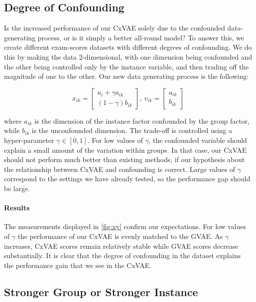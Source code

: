 \documentclass[nohyperref]{article}
\theoremstyle{plain}
\theoremstyle{definition}
\theoremstyle{remark}
\begin{document}
\subsection{Degree of Confounding}

Is the increased performance of our CxVAE solely due to the confounded data-generating process, or is it simply a better all-round model? To answer this, we create different exam-scores datasets with different degrees of confounding.  We do this by making the data 2-dimensional, with one dimension being confounded and the other being controlled only by the instance variable, and then trading off the magnitude of one to the other. Our new data generating process is the following:

\begin{equation}
x_{ik} = \begin{bmatrix}
u_i + \gamma a_{ik}\\
(1 - \gamma) b_{ik}
\end{bmatrix}, ~ v_{ik} = \begin{bmatrix}
a_{ik} \\ b_{ik}
\end{bmatrix}
\end{equation}

where $a_{ik}$ is the dimension of the instance factor confounded by the group factor, while $b_{ik}$ is the unconfounded dimension. The trade-off is controlled using a hyper-parameter $\gamma \in [0,1]$. For low values of $\gamma$, the confounded variable should explain a small amount of the variation within groups. In that case, our CxVAE should not perform much better than existing methods, if our hypothesis about the relationship between CxVAE and confounding is correct.  Large values of $\gamma$ correspond to the settings we have already tested, so the performance gap should be large.

\paragraph{Results} The measurements displayed in \cref{fig:xy} confirm our expectations. For low values of $\gamma$ the performance of our CxVAE is evenly matched to the GVAE.  As $\gamma$ increases, CxVAE scores remain relatively stable while GVAE scores decrease substantially.  It is clear that the degree of confounding in the dataset explains the performance gain that we see in the CxVAE. 

\subsection{Stronger Group or Stronger Instance}
\end{document}
